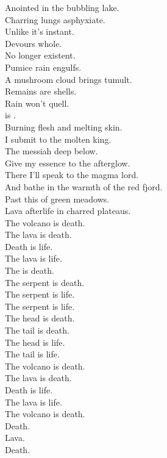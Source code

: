 Anointed in the bubbling lake. \\
Charring lungs asphyxiate. \\
Unlike  it's instant. \\
Devours whole. \\
No longer existent. \\
Pumice rain engulfs. \\
A mushroom cloud brings tumult. \\
Remains are shells. \\
Rain won't quell. \\
 is . \\

Burning flesh and melting skin. \\
I submit to the molten king. \\
The messiah deep below. \\
Give my essence to the afterglow. \\
There I'll speak to the magma lord. \\
And bathe in the warmth of the red fjord. \\
Past this  of green meadows. \\
Lava afterlife in charred plateaus. \\

The volcano is death. \\
The lava is death. \\
Death is life. \\
The lava is life. \\

The  is death. \\
The serpent is death. \\
The serpent is life. \\
The serpent is life. \\

The head is death. \\
The tail is death. \\
The head is life. \\
The tail is life. \\

The volcano is death. \\
The lava is death. \\
Death is life. \\
The lava is life. \\

The volcano is death. \\
Death. \\
Lava. \\
Death. \\

